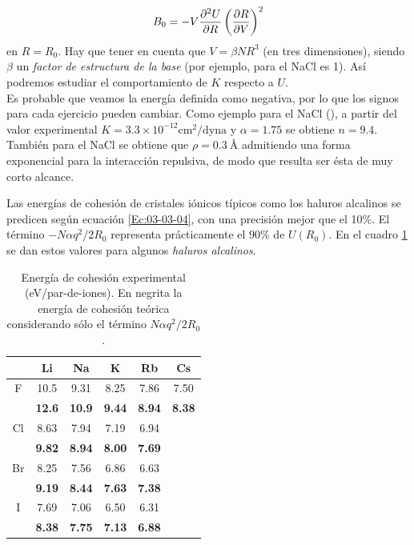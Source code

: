 \begin{equation}
	B_0 = - V \frac{\partial ^2 U}{\partial R} \left( \frac{\partial R}{\partial V} \right)^2
\end{equation}
en $R=R_0$. Hay que tener en cuenta que $V=\beta N R^3$ (en tres dimensiones), siendo $\beta$ un \textit{factor de estructura de la base} (por ejemplo, para el NaCl es 1). Así podremos estudiar el comportamiento de $K$ respecto a $U$.\\

Es probable que veamos la energía definida como negativa, por lo que los signos para cada ejercicio pueden cambiar.  Como ejemplo para el NaCl (\fcc), a partir del valor experimental $K=3.3\times 10^{-12} \unit{\cm}^2 / \text{dyna}$ y $\alpha = 1.75$ se obtiene $n=9.4$. También para el NaCl se obtiene que $\rho=0.3 \ \unit{\angstrom}$ admitiendo una forma exponencial para la interacción repulsiva, de modo que resulta ser ésta de muy corto alcance.


Las energías de cohesión de cristales iónicos típicos como los haluros alcalinos se predicen según ecuación \ref{Ec:03-03-04}, con una precisión mejor que el 10\%. El término $-N\alpha q^2 / 2 R_0$ representa prácticamente el 90\% de $U(R_0)$. En el cuadro \ref{Tab:03-03} se dan estos valores para  algunos \textit{haluros alcalinos}.

\begin{table}[h!] \centering
    \begin{tabular}{c|ccccc}
        & Li & Na & K & Rb & Cs \\ \hline
        F & 10.5 & 9.31 & 8.25 & 7.86 & 7.50 \\
          & \textbf{12.6} & \textbf{10.9} & \textbf{9.44} & \textbf{8.94} & \textbf{8.38} \\ \hline
        Cl & 8.63  & 7.94 & 7.19 & 6.94 & \\
           & \textbf{9.82} & \textbf{8.94} & \textbf{8.00} & \textbf{7.69} & \\ \hline  
        Br & 8.25 & 7.56 & 6.86 & 6.63 & \\
           & \textbf{9.19} & \textbf{8.44} & \textbf{7.63} & \textbf{7.38} & \\ \hline
        I & 7.69 & 7.06 & 6.50 & 6.31 & \\
        & \textbf{8.38} & \textbf{7.75} & \textbf{7.13} & \textbf{6.88} &  
    \end{tabular}
    \caption{Energía de cohesión experimental (eV/par-de-iones). En negrita la energía de cohesión teórica considerando sólo el término $N\alpha q^2 / 2 R_0$.}
    \label{Tab:03-03}
\end{table}


